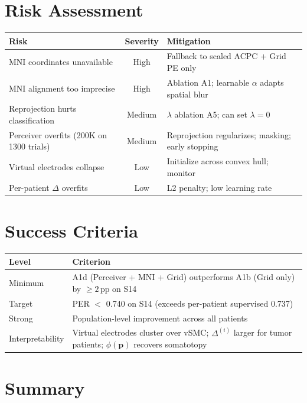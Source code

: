 \documentclass[11pt,letterpaper]{article}
\newcommand{\pp}{\,\text{pp}}
\newcommand{\bfp}{\mathbf{p}}
\begin{document}
\section{Risk Assessment}

\begin{table}[h]\centering\small
\begin{tabular}{@{}p{}cp{}@{}}
\toprule
\textbf{Risk} & \textbf{Severity} & \textbf{Mitigation} \\
\midrule
MNI coordinates unavailable & High & Fallback to scaled ACPC + Grid PE only \\
MNI alignment too imprecise & High & Ablation A1; learnable $\alpha$ adapts spatial blur \\
Reprojection hurts classification & Medium & $\lambda$ ablation A5; can set $\lambda{=}0$ \\
Perceiver overfits (200K on 1300 trials) & Medium & Reprojection regularizes; masking; early stopping \\
Virtual electrodes collapse & Low & Initialize across convex hull; monitor \\
Per-patient $\Delta$ overfits & Low & L2 penalty; low learning rate \\
\bottomrule
\end{tabular}
\end{table}


\section{Success Criteria}

\begin{table}[h]\centering\small
\begin{tabular}{@{}lp{9cm}@{}}
\toprule
\textbf{Level} & \textbf{Criterion} \\
\midrule
Minimum & A1d (Perceiver + MNI + Grid) outperforms A1b (Grid only) by ${\geq}2\pp$ on S14 \\
Target & PER ${<}$ 0.740 on S14 (exceeds per-patient supervised 0.737) \\
Strong & Population-level improvement across all patients \\
Interpretability & Virtual electrodes cluster over vSMC; $\Delta^{(i)}$ larger for tumor patients; $\phi(\bfp)$ recovers somatotopy \\
\bottomrule
\end{tabular}
\end{table}


\section{Summary}
\end{document}
